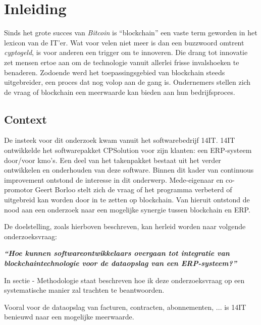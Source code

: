 
\chapter{Inleiding}
\label{ch:inleiding}

Sinds het grote succes van \textit{Bitcoin} is ``blockchain'' een vaste term geworden in het lexicon van de IT'er. Wat voor velen niet meer is dan een buzzwoord omtrent \textit{cyptogeld}, is voor anderen een trigger om te innoveren.
Die drang tot innovatie zet mensen ertoe aan om de technologie vanuit allerlei frisse invalshoeken te benaderen. Zodoende werd het toepassingsgebied van blockchain steeds uitgebreider, een proces dat nog volop aan de gang is. Ondernemers stellen zich de vraag of blockchain een meerwaarde kan bieden aan hun bedrijfsproces.

\section{Context}
\label{sec:context}

De insteek voor dit onderzoek kwam vanuit het softwarebedrijf 14IT. 14IT ontwikkelde het softwarepakket CPSolution voor zijn klanten: een ERP-systeem door/voor kmo's. Een deel van het takenpakket bestaat uit het verder ontwikkelen en onderhouden van deze software. Binnen dit kader van continuous improvement ontstond de interesse in dit onderwerp. Mede-eigenaar en co-promotor Geert Borloo stelt zich de vraag of het programma verbeterd of uitgebreid kan worden door in te zetten op blockchain. Van hieruit ontstond de nood aan een onderzoek naar een mogelijke synergie tussen blockchain en ERP. 

De doelstelling, zoals hierboven beschreven, kan herleid worden naar volgende onderzoeksvraag:

\begin{center}
	\textit{\textbf{``Hoe kunnen softwareontwikkelaars overgaan tot integratie van blockchaintechnologie voor de dataopslag van een ERP-systeem?''}}
\end{center}

In sectie - Methodologie staat beschreven hoe ik deze onderzoeksvraag op een systematische manier zal trachten te beantwoorden.

Vooral voor de dataopslag van facturen, contracten, abonnementen, ...  is 14IT benieuwd naar een mogelijke meerwaarde.

